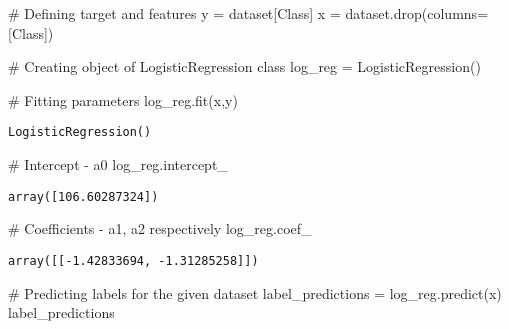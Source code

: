 \documentclass[
  letterpaper,
  DIV=11,
  numbers=noendperiod]{scrreprt}
\newenvironment{Shaded}{\begin{snugshade}}{\end{snugshade}}
\newcommand{\CommentTok}[1]{\textcolor[rgb]{0.37,0.37,0.37}{#1}}
\newcommand{\NormalTok}[1]{\textcolor[rgb]{0.00,0.23,0.31}{#1}}
\newcommand{\OperatorTok}[1]{\textcolor[rgb]{0.37,0.37,0.37}{#1}}
\newcommand{\StringTok}[1]{\textcolor[rgb]{0.13,0.47,0.30}{#1}}
\begin{document}
\begin{Shaded}
\begin{Highlighting}[]
\CommentTok{\# Defining target and features}
\NormalTok{y }\OperatorTok{=}\NormalTok{ dataset[}\StringTok{\textquotesingle{}Class\textquotesingle{}}\NormalTok{]}
\NormalTok{x }\OperatorTok{=}\NormalTok{ dataset.drop(columns}\OperatorTok{=}\NormalTok{[}\StringTok{\textquotesingle{}Class\textquotesingle{}}\NormalTok{])}
\end{Highlighting}
\end{Shaded}

\begin{Shaded}
\begin{Highlighting}[]
\CommentTok{\# Creating object of LogisticRegression class}
\NormalTok{log\_reg }\OperatorTok{=}\NormalTok{ LogisticRegression()}
\end{Highlighting}
\end{Shaded}

\begin{Shaded}
\begin{Highlighting}[]
\CommentTok{\# Fitting parameters}
\NormalTok{log\_reg.fit(x,y)}
\end{Highlighting}
\end{Shaded}

\begin{verbatim}
LogisticRegression()
\end{verbatim}

\begin{Shaded}
\begin{Highlighting}[]
\CommentTok{\# Intercept {-} a0}
\NormalTok{log\_reg.intercept\_}
\end{Highlighting}
\end{Shaded}

\begin{verbatim}
array([106.60287324])
\end{verbatim}

\begin{Shaded}
\begin{Highlighting}[]
\CommentTok{\# Coefficients {-} a1, a2 respectively}
\NormalTok{log\_reg.coef\_}
\end{Highlighting}
\end{Shaded}

\begin{verbatim}
array([[-1.42833694, -1.31285258]])
\end{verbatim}

\begin{Shaded}
\begin{Highlighting}[]
\CommentTok{\# Predicting labels for the given dataset}
\NormalTok{label\_predictions }\OperatorTok{=}\NormalTok{ log\_reg.predict(x)}
\NormalTok{label\_predictions}
\end{Highlighting}
\end{Shaded}
\end{document}
